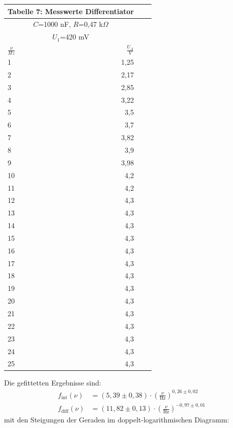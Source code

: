 \documentclass{scrartcl}
\begin{document}
\begin{minipage}{0.6\textwidth}
\begin{tabular}{@{}lr@{}lr@{}}
     \multicolumn{2}{c}{Tabelle 7: Messwerte Differentiator} \\
      \toprule
    \multicolumn{2}{c}{$C$=1000 nF, $R$=0,47 k$\Omega$} \\
     \multicolumn{2}{c}{$U_1$=420 mV} \\
    \cmidrule(r){1-2}
    $\frac{\nu}{Hz}$ & $\frac{U_A}{V}$ \\

    \midrule
	1	& 1,25 \\
	2	& 2,17 \\
	3	& 2,85 \\
    	4	& 3,22 \\
    	5	&  3,5 \\
    	6	& 3,7 \\
    	7	& 3,82 \\
    	8	& 3,9 \\
	9	& 3,98 \\
	10	& 4,2 \\
     	11	& 4,2 \\
     	12	& 4,3 \\
     	13	& 4,3 \\
     	14	& 4,3 \\
     	15	& 4,3 \\
     	16	& 4,3 \\
     	17	& 4,3 \\
     	18	& 4,3 \\
     	19	& 4,3 \\
     	20	& 4,3 \\
     	21	& 4,3 \\
     	22	& 4,3 \\
     	23	& 4,3 \\
     	24	& 4,3 \\
     	25	& 4,3 \\
     \bottomrule
\end{tabular}
\end{minipage}
\newpage
\noindent
Die gefittetten Ergebnisse sind:
 \begin{align}
     f_{\text{int}}(\nu)&=(5,39\pm0,38)\cdot \left(\frac{\nu}{\text{Hz}}\right)^{0,26\pm0,02}\\
     f_{\text{diff}}(\nu)&=(11,82\pm0,13)\cdot \left(\frac{\nu}{\text{Hz}}\right)^{-0,97\pm0,01}
 \end{align}
 mit den Steigungen der Geraden im doppelt-logarithmischen Diagramm:
\end{document}
